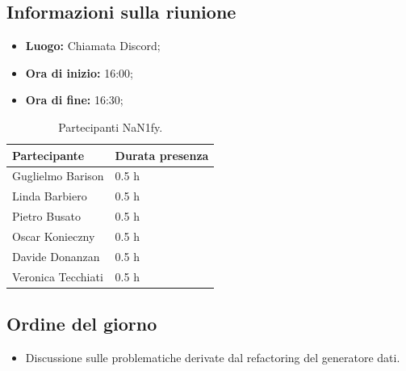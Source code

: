 \documentclass[8pt]{article}
\begin{document}
\subsection{Informazioni sulla riunione}
\begin{itemize}
	\setlength\itemsep{0em}
	\item\textbf{Luogo:} Chiamata Discord;
	\item\textbf{Ora di inizio:} 16:00;
  \item\textbf{Ora di fine:}  16:30;
\end{itemize}
\begin{table}[ht!]
	\begin{minipage}[t]{0.5\linewidth}
		\centering
		\begin{tabular}{p{3cm} p{3cm}}
			\toprule
			\textbf{Partecipante} & \textbf{Durata presenza} \\
			\midrule
			Guglielmo Barison & 0.5 h \\
			Linda Barbiero &  0.5 h \\
			Pietro Busato & 0.5 h \\
			Oscar Konieczny & 0.5 h \\
			Davide Donanzan & 0.5 h \\
			Veronica Tecchiati & 0.5 h \\
			\bottomrule
		\end{tabular}
		\caption{Partecipanti NaN1fy.}
		\label{table:Partecipanti NaN1fy}
	\end{minipage} 
\end{table}
\subsection{Ordine del giorno}
\begin{itemize}
	\setlength\itemsep{0em}
    \item Discussione sulle problematiche derivate dal refactoring del generatore dati.
\end{itemize}
\end{document}
